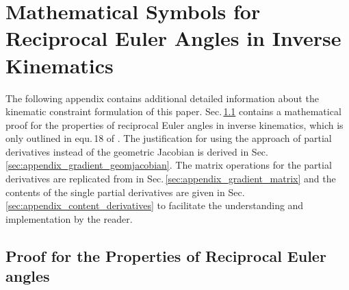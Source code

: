 \documentclass[robotics,article,submit,moreauthors,pdftex]{Definitions/mdpi}
\begin{document}
\appendix
\section{Mathematical Symbols for Reciprocal Euler Angles in Inverse Kinematics}
\label{sec:appendix_proof_REW}


The following appendix contains additional detailed information about the kinematic constraint formulation of this paper.
Sec.\,\ref{sec:appendix_eulerreciproc} contains a mathematical proof for the properties of reciprocal Euler angles in inverse kinematics, which is only outlined in equ.\,18 of \cite{1_SchapplerTapOrt2019}.
The justification for using the approach of partial derivatives instead of the geometric Jacobian is derived in Sec.\,\ref{sec:appendix_gradient_geomjacobian}.
The matrix operations for the partial derivatives are replicated from \cite{1_SchapplerTapOrt2019} in Sec.\,\ref{sec:appendix_gradient_matrix} and the contents of the single partial derivatives are given in Sec.\,\ref{sec:appendix_content_derivatives} to facilitate the understanding and implementation by the reader.

\subsection{Proof for the Properties of Reciprocal Euler angles}
\label{sec:appendix_eulerreciproc}
\end{document}
